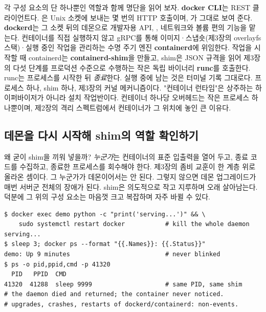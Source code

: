 각 구성 요소의 단 하나뿐인 역할과 함께 명단을 읽어 보자. \textbf{docker CLI}는 REST 클라이언트다. 은 Unix 소켓에 보내는 몇 번의 HTTP 호출이며, 가 그대로 보여 준다. \textbf{dockerd}는 그 소켓 뒤의 데몬으로 개발자용 API, , 네트워크와 볼륨 편의 기능을 맡는다. 컨테이너를 직접 실행하지 않고 gRPC를 통해 이미지·스냅숏(제3장의 overlayfs 스택)·실행 중인 작업을 관리하는 수명 주기 엔진 \textbf{containerd}에 위임한다. 작업을 시작할 때 containerd는 \textbf{containerd-shim}을 만들고, shim은 JSON 규격을 읽어 제3장의 다섯 단계를 프로덕션 수준으로 수행하는 작은 독립 바이너리 \textbf{runc}를 호출한다. runc는 프로세스를 시작한 뒤 \textit{종료}한다. 실행 중에 남는 것은 터미널 기록 그대로다. 프로세스 하나, shim 하나, 제3장의 커널 메커니즘이다. "컨테이너 런타임"은 상주하는 하이퍼바이저가 아니라 설치 작업반이다. 컨테이너 하나당 오버헤드는 작은 프로세스 하나뿐이며, 제2장의 격리 스펙트럼에서 컨테이너가 그 위치에 놓인 큰 이유다.

\subsection*{데몬을 다시 시작해 shim의 역할 확인하기}

왜 굳이 shim을 끼워 넣을까? \textit{누군가}는 컨테이너의 표준 입출력을 열어 두고, 종료 코드를 수집하고, 종료한 프로세스를 회수해야 한다. 제3장의 좀비 교훈이 한 계층 위로 올라온 셈이다. 그 누군가가 데몬이어서는 안 된다. 그렇지 않으면 데몬 업그레이드가 매번 서버군 전체의 장애가 된다. shim은 의도적으로 작고 지루하며 오래 살아남는다. 덕분에 그 위의 구성 요소는 마음껏 크고 복잡하며 자주 바뀔 수 있다.

\begin{terminalbox}
\begin{Verbatim}[breaklines=true,breakanywhere=true,fontsize=\small,formatcom=\color{tbbtermfg},codes=\tbbcodeactive]
$ docker exec demo python -c "print('serving...')" && \
    sudo systemctl restart docker           # kill the whole daemon
serving...
$ sleep 3; docker ps --format "{{.Names}}: {{.Status}}"
demo: Up 9 minutes                          # never blinked
$ ps -o pid,ppid,cmd -p 41320
  PID   PPID  CMD
41320  41288  sleep 9999                    # same PID, same shim
# the daemon died and returned; the container never noticed.
# upgrades, crashes, restarts of dockerd/containerd: non-events.
\end{Verbatim}
\end{terminalbox}

